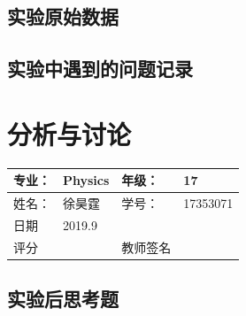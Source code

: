 \documentclass{ctexart}
\begin{document}
\subsection{实验原始数据}
\subsection{实验中遇到的问题记录}
\newpage        
\section{分析与讨论}
\begin{tabular}{|p{8em}|p{8em}|p{8em}|p{8em}|}
	\hline 
	专业：     &Physics       &年级：      & 17     \\
	\hline
	姓名：& 徐昊霆 &学号：&17353071  \\
	\hline
	日期&     2019.9               & &  \\
	\hline	
	评分 & & 教师签名 & \\
	\hline
\end{tabular}



\subsection{实验后思考题}



\end{document}
